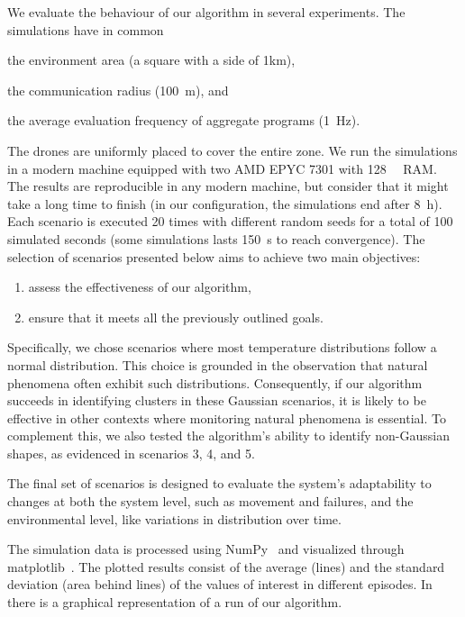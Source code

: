 We evaluate the behaviour of our algorithm in several experiments. %
 The simulations have in common
 \begin{enumerate*}%
  \item the environment area (a square with a side of 1km),
  \item the communication radius (\SI{100}{\metre}), and
  \item the average evaluation frequency of aggregate programs (\SI{1}{\hertz}).
\end{enumerate*}
The drones are uniformly placed to cover the entire zone.
We run the simulations in a modern machine equipped with two AMD EPYC 7301 with \SI{128}{\giga\byte} RAM.
 The results are reproducible in any modern machine, but consider that it might take a long time to finish
 (in our configuration, the simulations end after \SI{8}{\hour}).
%
Each scenario is executed 20 times with different random seeds
 for a total of 100 simulated seconds (some simulations lasts \SI{150}{\second} to reach convergence).
%
The selection of scenarios presented below aims to achieve two main objectives:
\begin{enumerate}
    \item assess the effectiveness of our algorithm,
    \item ensure that it meets all the previously outlined goals.
\end{enumerate}
Specifically, we chose scenarios where most temperature distributions follow a normal distribution. 
 This choice is grounded in the observation that natural phenomena often exhibit such distributions. 
 Consequently, if our algorithm succeeds in identifying clusters in these Gaussian scenarios, it is likely to be effective in other contexts where monitoring natural phenomena is essential. 
 To complement this, we also tested the algorithm's ability to identify non-Gaussian shapes, as evidenced in scenarios 3, 4, and 5.

The final set of scenarios is designed to evaluate the system's adaptability to changes at both the system level, 
 such as movement and failures, and the environmental level, like variations in distribution over time.

The simulation data is processed using NumPy~\cite{harris2020array} and visualized through matplotlib~\cite{Hunter:2007}.
%
The plotted results consist of the average (lines)
 and the standard deviation (area behind lines)
 of the values of interest in different episodes.
%
In  there is a graphical representation of a run of our algorithm.

